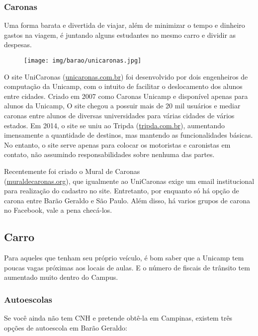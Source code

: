 \subsubsection*{Caronas}

Uma forma barata e divertida de viajar, além de minimizar o tempo e dinheiro
gastos na viagem, é juntando alguns estudantes no mesmo carro e dividir as
despesas.
\begin{figure}[h!]  \centering
    \texttt{[image: img/barao/unicaronas.jpg]}
\end{figure}

O site UniCaronas (\url{unicaronas.com.br}) foi desenvolvido por dois
engenheiros de computação da Unicamp, com o intuito de facilitar o deslocamento
dos alunos entre cidades. Criado em 2007 como Caronas Unicamp e disponível
apenas para alunos da Unicamp, O site chegou a possuir mais de 20 mil usuários e
mediar caronas entre alunos de diversas universidades para várias cidades de
vários estados. Em 2014, o site se uniu ao Tripda (\url{tripda.com.br}),
aumentando imensamente a quantidade de destinos, mas mantendo as funcionalidades
básicas. No entanto, o site serve apenas para colocar os motoristas e caronistas
em contato, não assumindo responsabilidades sobre nenhuma das partes.

Recentemente foi criado o Mural de Caronas\\(\url{muraldecaronas.org}), que
igualmente ao UniCaronas exige um email institucional para realização do
cadastro no site. Entretanto, por enquanto só há opção de carona entre Barão
Geraldo e São Paulo. Além disso, há varios grupos de carona no Facebook, vale a
pena checá-los.

\subsection{Carro}

Para aqueles que tenham seu próprio veículo, é bom saber que a Unicamp tem
poucas vagas próximas aos locais de aulas. E o número de fiscais de trânsito tem
aumentado muito dentro do Campus.

\subsubsection*{Autoescolas}

Se você ainda não tem CNH e pretende obtê-la em Campinas, existem três opções de
autoescola em Barão Geraldo:

